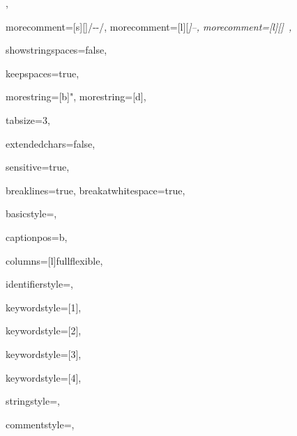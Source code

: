 {%

,

morecomment=[s][\color{commentcolor}]{/-}{-/},
morecomment=[l][\itshape \color{commentcolor}]{--},
morecomment=[l][\color{backgroundcolor}]{~},

showstringspaces=false,

keepspaces=true,

morestring=[b]",
morestring=[d],

tabsize=3,

extendedchars=false,

sensitive=true,

breaklines=true,
breakatwhitespace=true,

basicstyle=\ttfamily\small,

captionpos=b,

columns=[l]fullflexible,


identifierstyle={\ttfamily\color{black}},

keywordstyle=[1]{\ttfamily\color{tacticcolor}},

keywordstyle=[2]{\ttfamily\color{keywordcolor}},

keywordstyle=[3]{\ttfamily\color{tacticcolor}},

keywordstyle=[4]{\ttfamily\color{attributecolor}},

stringstyle=\ttfamily,

commentstyle={\ttfamily\footnotesize },

}


